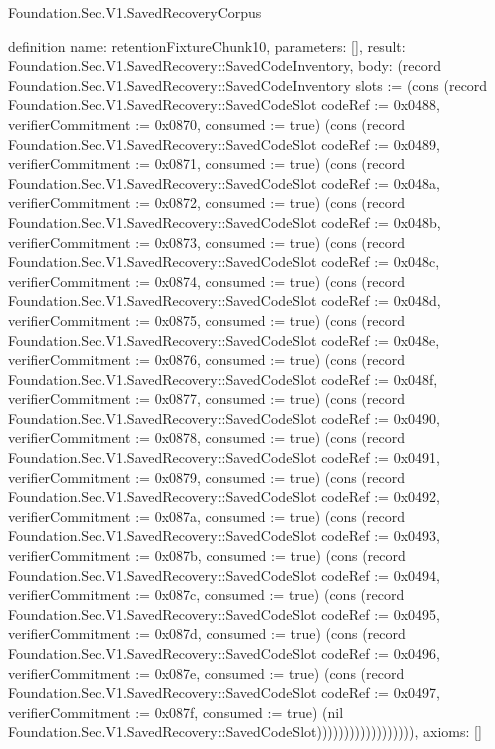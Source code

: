 \begin{lexlean}{Foundation.Sec.V1.SavedRecoveryCorpus}
\begin{semanticmodule}
definition{
  name: retentionFixtureChunk10,
  parameters: [],
  result: Foundation.Sec.V1.SavedRecovery::SavedCodeInventory,
  body: (record Foundation.Sec.V1.SavedRecovery::SavedCodeInventory {slots := (cons (record Foundation.Sec.V1.SavedRecovery::SavedCodeSlot {codeRef := 0x0488, verifierCommitment := 0x0870, consumed := true}) (cons (record Foundation.Sec.V1.SavedRecovery::SavedCodeSlot {codeRef := 0x0489, verifierCommitment := 0x0871, consumed := true}) (cons (record Foundation.Sec.V1.SavedRecovery::SavedCodeSlot {codeRef := 0x048a, verifierCommitment := 0x0872, consumed := true}) (cons (record Foundation.Sec.V1.SavedRecovery::SavedCodeSlot {codeRef := 0x048b, verifierCommitment := 0x0873, consumed := true}) (cons (record Foundation.Sec.V1.SavedRecovery::SavedCodeSlot {codeRef := 0x048c, verifierCommitment := 0x0874, consumed := true}) (cons (record Foundation.Sec.V1.SavedRecovery::SavedCodeSlot {codeRef := 0x048d, verifierCommitment := 0x0875, consumed := true}) (cons (record Foundation.Sec.V1.SavedRecovery::SavedCodeSlot {codeRef := 0x048e, verifierCommitment := 0x0876, consumed := true}) (cons (record Foundation.Sec.V1.SavedRecovery::SavedCodeSlot {codeRef := 0x048f, verifierCommitment := 0x0877, consumed := true}) (cons (record Foundation.Sec.V1.SavedRecovery::SavedCodeSlot {codeRef := 0x0490, verifierCommitment := 0x0878, consumed := true}) (cons (record Foundation.Sec.V1.SavedRecovery::SavedCodeSlot {codeRef := 0x0491, verifierCommitment := 0x0879, consumed := true}) (cons (record Foundation.Sec.V1.SavedRecovery::SavedCodeSlot {codeRef := 0x0492, verifierCommitment := 0x087a, consumed := true}) (cons (record Foundation.Sec.V1.SavedRecovery::SavedCodeSlot {codeRef := 0x0493, verifierCommitment := 0x087b, consumed := true}) (cons (record Foundation.Sec.V1.SavedRecovery::SavedCodeSlot {codeRef := 0x0494, verifierCommitment := 0x087c, consumed := true}) (cons (record Foundation.Sec.V1.SavedRecovery::SavedCodeSlot {codeRef := 0x0495, verifierCommitment := 0x087d, consumed := true}) (cons (record Foundation.Sec.V1.SavedRecovery::SavedCodeSlot {codeRef := 0x0496, verifierCommitment := 0x087e, consumed := true}) (cons (record Foundation.Sec.V1.SavedRecovery::SavedCodeSlot {codeRef := 0x0497, verifierCommitment := 0x087f, consumed := true}) (nil Foundation.Sec.V1.SavedRecovery::SavedCodeSlot)))))))))))))))))}),
  axioms: []
}


\end{semanticmodule}
\end{lexlean}
